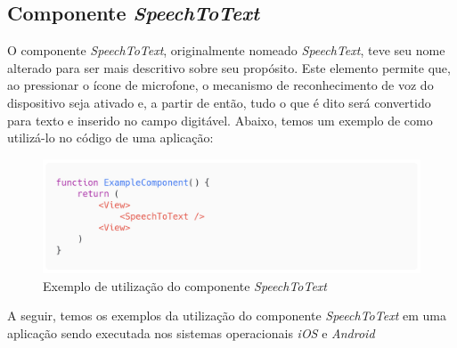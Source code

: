 \documentclass[
	12pt,				    %
	openright,			    %
	oneside,			    %
	a4paper,			    %
    sumario=tradicional,    %
	english,			    %
	brazil,				    %
	]{abntex2}              %
\begin{document}
\subsection{Componente \textit{SpeechToText}}

O componente \textit{SpeechToText}, originalmente nomeado \textit{SpeechText}, teve seu nome alterado para ser mais descritivo sobre seu propósito. Este elemento permite que, ao pressionar o ícone de microfone, o mecanismo de reconhecimento de voz do dispositivo seja ativado e, a partir de então, tudo o que é dito será convertido para texto e inserido no campo digitável. Abaixo, temos um exemplo de como utilizá-lo no código de uma aplicação:

\begin{figure}[H]
	\begin{center}
		\includegraphics[width=.8\linewidth]{images/SpeechToText.png}
		\caption[Componente \textit{SpeechToText}]{Exemplo de utilização do componente \textit{SpeechToText}}
		\label{fig:speechToTextExample}
	\end{center}
\end{figure}


\par

A seguir, temos os exemplos da utilização do componente \textit{SpeechToText} em uma aplicação sendo executada nos sistemas operacionais \textit{iOS} e \textit{Android}
\end{document}

